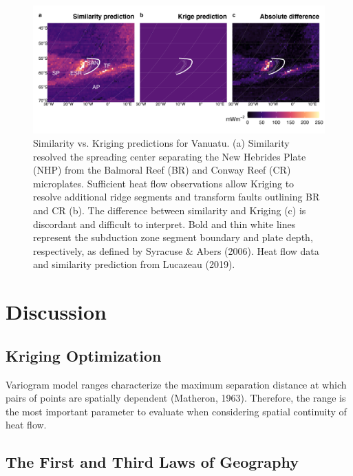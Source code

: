 \documentclass[draft,linenumbers]{agujournal2018}
\begin{document}
\begin{figure}[h]

{\centering \includegraphics[width=0.95\linewidth,]{../figs/diff/custom/Scotia} 

}

\caption{Similarity vs. Kriging predictions for Vanuatu. (a) Similarity resolved the spreading center separating the New Hebrides Plate (NHP) from the Balmoral Reef (BR) and Conway Reef (CR) microplates. Sufficient heat flow observations allow Kriging to resolve additional ridge segments and transform faults outlining BR and CR (b). The difference between similarity and Kriging (c) is discordant and difficult to interpret. Bold and thin white lines represent the subduction zone segment boundary and plate depth, respectively, as defined by Syracuse \& Abers (2006). Heat flow data and similarity prediction from Lucazeau (2019).}\label{fig:vanuatu.diff}
\end{figure}

\clearpage

\section{Discussion}

\subsection{Kriging Optimization}

Variogram model ranges characterize the maximum separation distance at
which pairs of points are spatially dependent (Matheron, 1963).
Therefore, the range is the most important parameter to evaluate when
considering spatial continuity of heat flow.

\subsection{The First and Third Laws of Geography}
\end{document}
